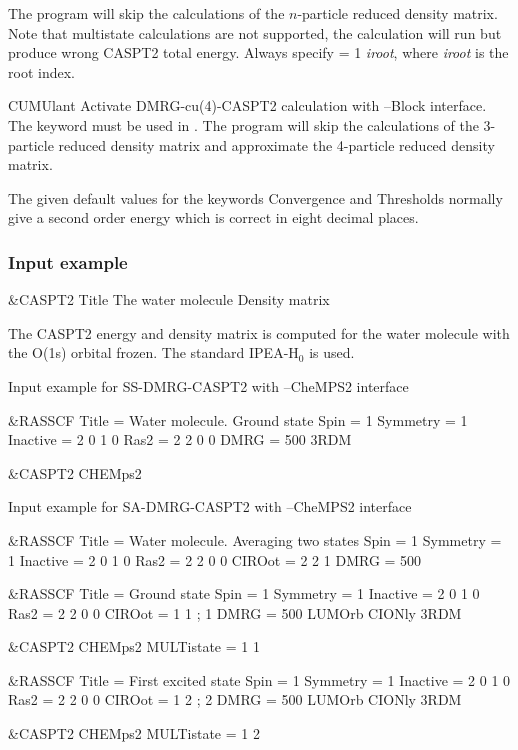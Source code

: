 \begin{keywordlist}
The program will skip the calculations of the $n$-particle reduced density matrix.
Note that multistate calculations are not supported, the calculation will run but produce wrong CASPT2 total energy.
Always specify  = 1 \emph{iroot}, where \emph{iroot} is the root index. 
\item[CUMUlant]
Activate DMRG-cu(4)-CASPT2 calculation with \molcas--Block interface.
The keyword  must be used in .
The program will skip the calculations of the 3-particle reduced density matrix and approximate 
the 4-particle reduced density matrix.
\end{keywordlist}

The given default values for the keywords
{\keyfont Convergence} and
{\keyfont Thresholds} normally give a second order energy which is correct
in eight decimal places.

\subsubsection{Input example}
\begin{inputlisting}
 &CASPT2
Title
 The water molecule
Density matrix
\end{inputlisting}
The CASPT2 energy and density matrix is computed for the water molecule with the
O(1s) orbital frozen. The standard IPEA-H$_0$ is used.

Input example for SS-DMRG-CASPT2 with \molcas--CheMPS2 interface

\begin{inputlisting}
 &RASSCF
Title    = Water molecule. Ground state
Spin     = 1
Symmetry = 1
Inactive = 2 0 1 0
Ras2     = 2 2 0 0
DMRG     = 500
3RDM

 &CASPT2
CHEMps2
\end{inputlisting}

Input example for SA-DMRG-CASPT2 with \molcas--CheMPS2 interface

\begin{inputlisting}
 &RASSCF
Title    = Water molecule. Averaging two states
Spin     = 1
Symmetry = 1
Inactive = 2 0 1 0
Ras2     = 2 2 0 0
CIROot   = 2 2 1
DMRG     = 500
 
 &RASSCF
Title    = Ground state
Spin     = 1
Symmetry = 1
Inactive = 2 0 1 0
Ras2     = 2 2 0 0
CIROot   = 1 1 ; 1
DMRG     = 500
LUMOrb
CIONly
3RDM

 &CASPT2
CHEMps2
MULTistate = 1 1
 
 &RASSCF
Title    = First excited state
Spin     = 1
Symmetry = 1
Inactive = 2 0 1 0
Ras2     = 2 2 0 0
CIROot   = 1 2 ; 2
DMRG     = 500
LUMOrb
CIONly
3RDM

 &CASPT2
CHEMps2
MULTistate = 1 2

\end{inputlisting}
